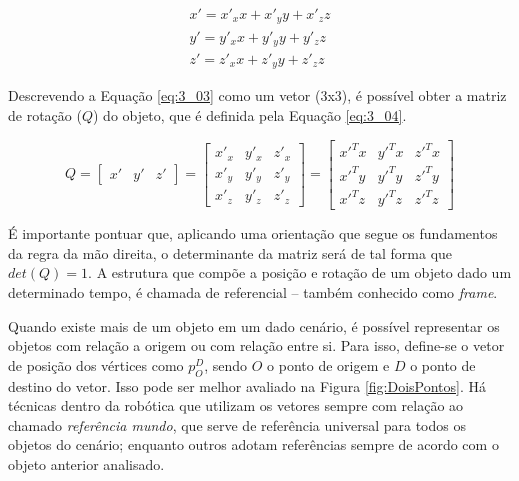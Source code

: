 \begin{equation}
\begin{matrix}
x' = x'_xx+x'_yy+x'_zz\\
y' = y'_xx+y'_yy+y'_zz\\
z' = z'_xx+z'_yy+z'_zz
\end{matrix}
\label{eq:3_03}
\end{equation}

Descrevendo a Equação \ref{eq:3_03} como um vetor (3x3), é possível obter a matriz de rotação ($Q$) do objeto, que é definida pela Equação \ref{eq:3_04}.

\begin{equation}
Q = 
\begin{bmatrix}
x' & y' & z'
\end{bmatrix}  = 
\begin{bmatrix}
x'_x & y'_x & z'_x \\
x'_y & y'_y & z'_y \\
x'_z & y'_z & z'_z
\end{bmatrix}  = 
\begin{bmatrix}
x'^Tx & y'^Tx & z'^Tx \\
x'^Ty & y'^Ty & z'^Ty \\
x'^Tz & y'^Tz & z'^Tz
\end{bmatrix}
\label{eq:3_04}
\end{equation}

É importante pontuar que, aplicando uma orientação que segue os fundamentos da regra da mão direita, o determinante da matriz será de tal forma que $det(Q) = 1$. A estrutura que compõe a posição e rotação de um objeto dado um determinado tempo, é chamada de referencial – também conhecido como \textit{frame}.


Quando existe mais de um objeto em um dado cenário, é possível representar os objetos com relação a origem ou com relação entre si. Para isso, define-se o vetor de posição dos vértices como $p_O^D$, sendo $O$ o ponto de origem e $D$ o ponto de destino do vetor. Isso pode ser melhor avaliado na Figura \ref{fig:DoisPontos}. Há técnicas dentro da robótica que utilizam os vetores sempre com relação ao chamado \textit{referência mundo}, que serve de referência universal para todos os objetos do cenário; enquanto outros adotam referências sempre de acordo com o objeto anterior analisado.

